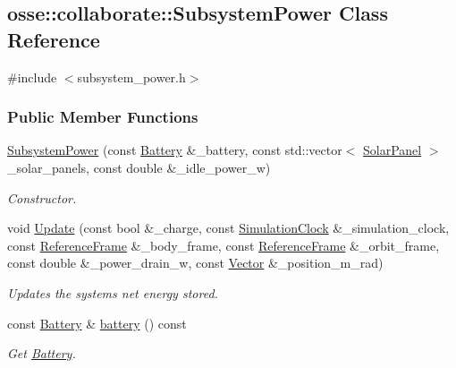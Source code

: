 \hypertarget{classosse_1_1collaborate_1_1_subsystem_power}{}\subsection{osse\+:\+:collaborate\+:\+:Subsystem\+Power Class Reference}
\label{classosse_1_1collaborate_1_1_subsystem_power}


{\ttfamily \#include $<$subsystem\+\_\+power.\+h$>$}

\subsubsection*{Public Member Functions}
\begin{DoxyCompactItemize}
\item 
\hyperlink{classosse_1_1collaborate_1_1_subsystem_power_a7dafdf11fd2f0d904353e2f385c905bc}{Subsystem\+Power} (const \hyperlink{classosse_1_1collaborate_1_1_battery}{Battery} \&\+\_\+battery, const std\+::vector$<$ \hyperlink{classosse_1_1collaborate_1_1_solar_panel}{Solar\+Panel} $>$ \+\_\+solar\+\_\+panels, const double \&\+\_\+idle\+\_\+power\+\_\+w)
\begin{DoxyCompactList}\small\item\em Constructor. \end{DoxyCompactList}\item 
void \hyperlink{classosse_1_1collaborate_1_1_subsystem_power_aba48698154d6b98d97c067fcb8c5f924}{Update} (const bool \&\+\_\+charge, const \hyperlink{classosse_1_1collaborate_1_1_simulation_clock}{Simulation\+Clock} \&\+\_\+simulation\+\_\+clock, const \hyperlink{classosse_1_1collaborate_1_1_reference_frame}{Reference\+Frame} \&\+\_\+body\+\_\+frame, const \hyperlink{classosse_1_1collaborate_1_1_reference_frame}{Reference\+Frame} \&\+\_\+orbit\+\_\+frame, const double \&\+\_\+power\+\_\+drain\+\_\+w, const \hyperlink{classosse_1_1collaborate_1_1_vector}{Vector} \&\+\_\+position\+\_\+m\+\_\+rad)
\begin{DoxyCompactList}\small\item\em Updates the system\textquotesingle{}s net energy stored. \end{DoxyCompactList}\item 
const \hyperlink{classosse_1_1collaborate_1_1_battery}{Battery} \& \hyperlink{classosse_1_1collaborate_1_1_subsystem_power_a609e653cc6c7e4a91ebd250219fabe95}{battery} () const
\begin{DoxyCompactList}\small\item\em Get \hyperlink{classosse_1_1collaborate_1_1_battery}{Battery}. \end{DoxyCompactList}\item 

\end{DoxyCompactItemize}
